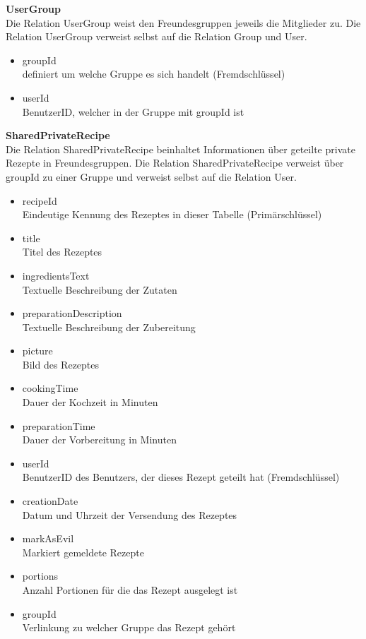\textbf{UserGroup}\\
Die Relation UserGroup weist den Freundesgruppen jeweils die Mitglieder zu. Die Relation UserGroup verweist selbst auf die Relation Group und User.

\begin{itemize}
	\item groupId \\ definiert um welche Gruppe es sich handelt (Fremdschlüssel)
	\item userId \\ BenutzerID, welcher in der Gruppe mit groupId ist
\end{itemize}

\textbf{SharedPrivateRecipe}\\
Die Relation SharedPrivateRecipe beinhaltet Informationen über geteilte private Rezepte in Freundesgruppen. Die Relation SharedPrivateRecipe verweist über groupId zu einer Gruppe und verweist selbst auf die Relation User.

\begin{itemize}
	\item recipeId \\ Eindeutige Kennung des Rezeptes in dieser Tabelle (Primärschlüssel)
	\item title \\ Titel des Rezeptes
	\item ingredientsText \\ Textuelle Beschreibung der Zutaten
	\item preparationDescription \\ Textuelle Beschreibung der Zubereitung
	\item picture \\ Bild des Rezeptes
	\item cookingTime \\ Dauer der Kochzeit in Minuten
	\item preparationTime \\ Dauer der Vorbereitung in Minuten
	\item userId \\ BenutzerID des Benutzers, der dieses Rezept geteilt hat (Fremdschlüssel)
	\item creationDate \\ Datum und Uhrzeit der Versendung des Rezeptes
	\item markAsEvil \\ Markiert gemeldete Rezepte
	\item portions \\ Anzahl Portionen für die das Rezept ausgelegt ist
	\item groupId \\ Verlinkung zu welcher Gruppe das Rezept gehört
\end{itemize}

